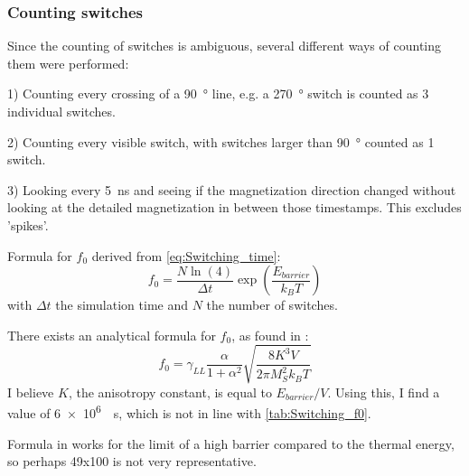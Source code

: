 \documentclass[10pt,a4paper]{article}
\begin{document}
\subsubsection{Counting switches}
Since the counting of switches is ambiguous, several different ways of counting them were performed:

1) Counting every crossing of a \SI{90}{\degree} line, e.g. a \SI{270}{\degree} switch is counted as 3 individual switches.

2) Counting every visible switch, with switches larger than \SI{90}{\degree} counted as 1 switch.

3) Looking every \SI{5}{\nano\second} and seeing if the magnetization direction changed without looking at the detailed magnetization in between those timestamps. This excludes 'spikes'.

Formula for $f_0$ derived from \eqref{eq:Switching_time}:
\begin{equation*}
    f_0 = \frac{N \ln(4)}{\Delta t} \exp(\frac{E_{barrier}}{k_B T})
\end{equation*}
with $\Delta t$ the simulation time and $N$ the number of switches.

There exists an analytical formula for $f_0$, as found in \cite{LEL-17b, MuMax3}:
\begin{equation}
    f_0 = \gamma_{LL} \frac{\alpha}{1+\alpha^2} \sqrt{\frac{8 K^3 V}{2 \pi M_S^2 k_B T}}
\end{equation}
I believe $K$, the anisotropy constant, is equal to $E_{barrier}/V$. Using this, I find a value of \SI{6e6}{\per\second}, which is not in line with \cref{tab:Switching_f0}.

Formula in \cite{MuMax3} works for the limit of a high barrier compared to the
thermal energy, so perhaps 49x100 is not very representative.
\end{document}
